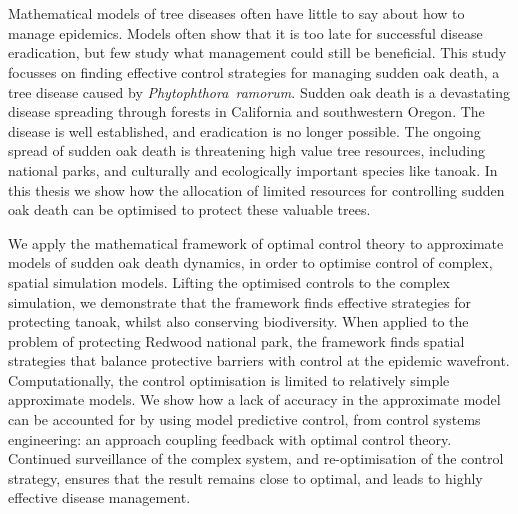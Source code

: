 %

\let\cleardoublepage\relax
{}

{\chapter*{}}
\label{sec:abstract}
\vspace*{-10mm}
\thispagestyle{empty}

\begin{center}
    {\Large\thesisTitle}
    
    \vspace*{5mm}
    
    {\large\thesisName}
    \vspace*{10mm}
\end{center}

Mathematical models of tree diseases often have little to say about how to manage epidemics. Models often show that it is too late for successful disease eradication, but few study what management could still be beneficial. This study focusses on finding effective control strategies for managing sudden oak death, a tree disease caused by \emph{Phytophthora~ramorum}. Sudden oak death is a devastating disease spreading through forests in California and southwestern Oregon. The disease is well established, and eradication is no longer possible. The ongoing spread of sudden oak death is threatening high value tree resources, including national parks, and culturally and ecologically important species like tanoak. In this thesis we show how the allocation of limited resources for controlling sudden oak death can be optimised to protect these valuable trees.

We apply the mathematical framework of optimal control theory to approximate models of sudden oak death dynamics, in order to optimise control of complex, spatial simulation models. Lifting the optimised controls to the complex simulation, we demonstrate that the framework finds effective strategies for protecting tanoak, whilst also conserving biodiversity. When applied to the problem of protecting Redwood national park, the framework finds spatial strategies that balance protective barriers with control at the epidemic wavefront. Computationally, the control optimisation is limited to relatively simple approximate models. We show how a lack of accuracy in the approximate model can be accounted for by using model predictive control, from control systems engineering: an approach coupling feedback with optimal control theory. Continued surveillance of the complex system, and re-optimisation of the control strategy, ensures that the result remains close to optimal, and leads to highly effective disease management.

